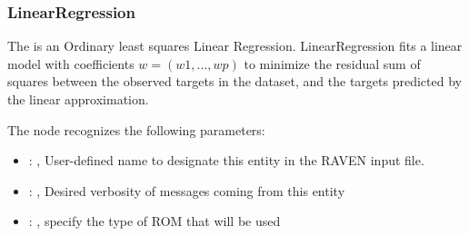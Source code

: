 \subsubsection{LinearRegression}
  The                          is an Ordinary least squares Linear
  Regression.                         LinearRegression fits a linear model with coefficients $w =
  (w1, …, wp)$ to                         minimize the residual sum of squares between the observed
  targets in the                         dataset, and the targets predicted by the linear
  approximation.                         

  The  node recognizes the following parameters:
    \begin{itemize}
      \item {}: , 
        User-defined name to designate this entity in the RAVEN input file.
      \item {}: , 
        Desired verbosity of messages coming from this entity
      \item {}: , 
        specify the type of ROM that will be used
  \end{itemize}

